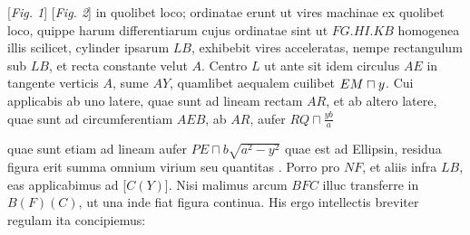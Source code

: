 \vspace*{1em}
\hspace*{15mm} [\textit{Fig. 1}]\hspace*{70mm} [\textit{Fig. 2}]
\newpage
\count{}
\pstart
 \noindent {} in quolibet loco; ordinatae erunt ut vires machinae\protect{} ex  quolibet loco, quippe harum differentiarum  cujus ordinatae sint ut $FG. HI. KB$ homogenea illis scilicet, cylinder\protect{} ipsarum $LB$, exhibebit vires acceleratas\protect{}, nempe rectangulum sub $LB$, et recta constante velut $A$. 
\pend
\pstart Centro $L$ ut ante sit idem circulus $AE$ in tangente verticis $A$, sume $AY$, quamlibet aequalem cuilibet $EM \hspace{0.1mm} \sqcap  \hspace{0.1mm}y$. Cui applicabis  ab uno latere, quae sunt ad lineam rectam $AR$, et  ab altero latere, quae sunt ad circumferentiam $AEB$, ab $AR$, aufer $RQ \sqcap \displaystyle\frac{yb}{a}$\rule[-4mm]{0pt}{10mm} quae sunt etiam ad lineam  aufer $PE \sqcap b \sqrt{a^2-y^2}$ quae est ad Ellipsin, residua figura erit summa omnium virium seu quantitas . Porro pro $NF$, et aliis infra $LB$, eas applicabimus ad [$C(Y)$]. Nisi malimus arcum $BFC$ illuc transferre in $B(F)(C)$, ut una inde fiat figura continua. His ergo intellectis breviter regulam ita concipiemus: 
